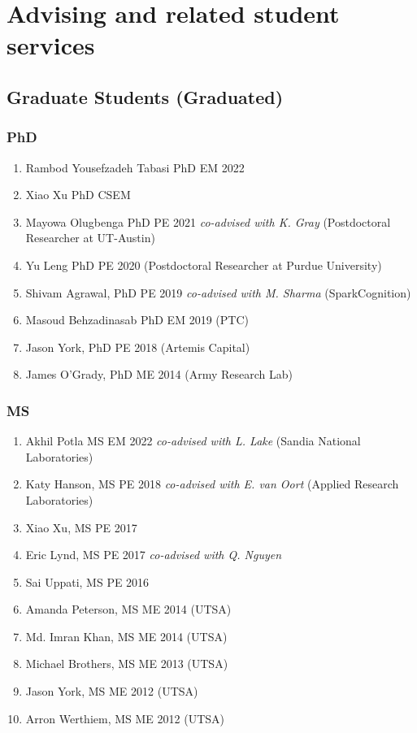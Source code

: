 \section*{Advising and related student services}

\subsection*{Graduate Students (Graduated)}

\subsubsection*{PhD}
\begin{enumerate}
    \item Rambod Yousefzadeh Tabasi PhD EM 2022
    \item Xiao Xu PhD CSEM
    \item Mayowa Olugbenga PhD PE 2021 \emph{co-advised with K. Gray} (Postdoctoral Researcher at UT-Austin)
    \item Yu Leng PhD PE 2020 (Postdoctoral Researcher at Purdue University)
    \item Shivam Agrawal, PhD PE 2019 \emph{co-advised with M. Sharma} (SparkCognition)
    \item Masoud Behzadinasab PhD EM 2019 (PTC)
    \item Jason York, PhD PE 2018 (Artemis Capital) 
    \item James O'Grady, PhD ME 2014 (Army Research Lab)
\end{enumerate}

\subsubsection*{MS}
\begin{enumerate}
    \item Akhil Potla MS EM 2022 \emph{co-advised with L. Lake} (Sandia National Laboratories)
    \item Katy Hanson, MS PE 2018 \emph{co-advised with E. van Oort} (Applied Research Laboratories)
    \item Xiao Xu, MS PE 2017
    \item Eric Lynd, MS PE 2017  \emph{co-advised with Q. Nguyen}
    \item Sai Uppati, MS PE 2016
    \item Amanda Peterson, MS ME 2014 (UTSA)
    \item Md. Imran Khan, MS ME 2014 (UTSA)
    \item Michael Brothers, MS ME 2013 (UTSA)
    \item Jason York, MS ME 2012 (UTSA)
    \item Arron Werthiem, MS ME 2012 (UTSA)
\end{enumerate}

